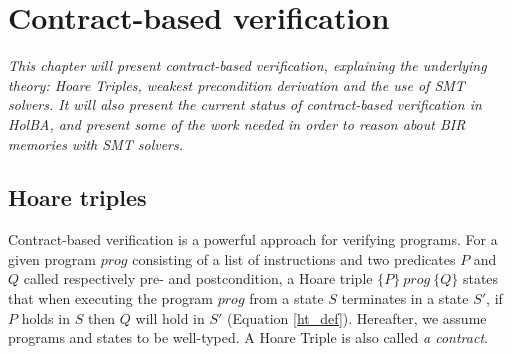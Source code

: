 \documentclass{kththesis}
\newcommand{\htriple}[3]{\ensuremath{\{#1\}~#2~\{#3\}}}
\begin{document}
{%
%

\chapter{Contract-based verification} \label{contract-based-verif}
\vspace{-1cm}
\textit{This chapter will present contract-based verification, explaining the underlying theory: Hoare Triples, weakest precondition derivation and the use of SMT solvers. It will also present the current status of contract-based verification in HolBA, and present some of the work needed in order to reason about BIR memories with SMT solvers.}

\section{Hoare triples} \label{hoare-triples}

Contract-based verification is a powerful approach for verifying programs. For a given program $prog$ consisting of a list of instructions and two predicates $P$ and $Q$ called respectively pre- and postcondition, a Hoare triple \htriple{P}{prog}{Q} states that when executing the program $prog$ from a state $S$ terminates in a state $S'$, if $P$ holds in $S$ then $Q$ will hold in $S'$ (Equation \ref{ht_def}). Hereafter, we assume programs and states to be well-typed. A Hoare Triple is also called \textit{a contract}.

}
\end{document}
